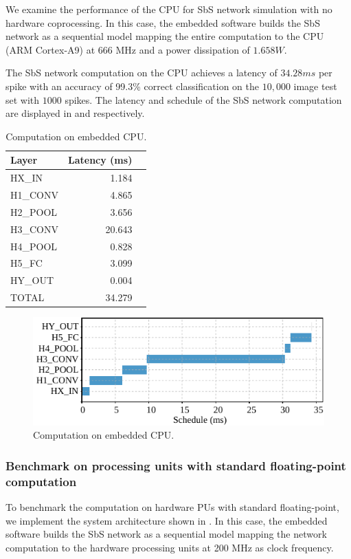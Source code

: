 We examine the performance of the CPU for SbS network simulation with no hardware coprocessing. In this case, the embedded software builds the SbS network as a sequential model mapping the entire computation to the CPU (ARM Cortex-A9) at 666 MHz and a power dissipation of $1.658 W$.

The SbS network computation on the CPU achieves a latency of $34.28 ms$ per spike with an accuracy of 99.3\% correct classification on the $10,000$ image test set with $1000$ spikes. The latency and schedule of the SbS network computation are displayed in  and  respectively.

\begin{table}[!t]\centering
	\caption{Computation on embedded CPU.}\label{tab:latency_sw}
	\scriptsize
\begin{tabular}{lrr}\toprule
	\textbf{Layer} &\textbf{Latency (ms)} \\\midrule
	HX\_IN &1.184 \\
	H1\_CONV &4.865 \\
	H2\_POOL &3.656 \\
	H3\_CONV &20.643 \\
	H4\_POOL &0.828 \\
	H5\_FC &3.099 \\
	HY\_OUT &0.004 \\
		
	TOTAL &34.279 \\
	\bottomrule
\end{tabular}
\end{table}

\begin{figure}[t!]
	\centering
	\includegraphics[width=1\columnwidth]{../figures/latency_sw.pdf}
	\caption{Computation on embedded CPU.}
	\label{fig:latency_sw}
\end{figure}

\subsubsection{Benchmark on processing units with standard floating-point computation}
To benchmark the computation on hardware PUs with standard floating-point, we implement the system architecture shown in . In this case, the embedded software builds the SbS network as a sequential model mapping the network computation to the hardware processing units at 200 MHz as clock frequency.

